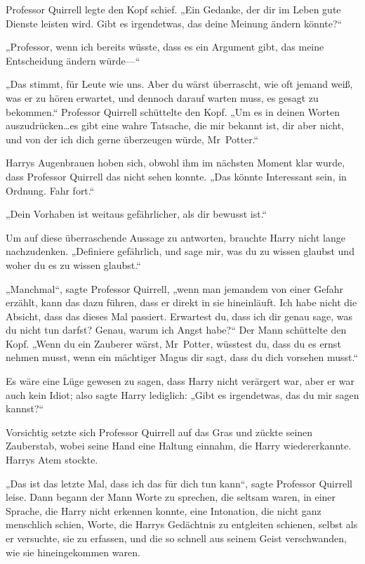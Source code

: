{Professor Quirrell legte den Kopf schief. „Ein Gedanke, der dir im Leben gute Dienste leisten wird. Gibt es irgendetwas, das deine Meinung ändern könnte?“

„Professor, wenn ich bereits wüsste, dass es ein Argument gibt, das meine Entscheidung ändern würde—“

„Das stimmt, für Leute wie uns. Aber du wärst überrascht, wie oft jemand weiß, was er zu hören erwartet, und dennoch darauf warten muss, es gesagt zu bekommen.“ Professor Quirrell schüttelte den Kopf. „Um es in deinen Worten auszudrücken…es gibt eine wahre Tatsache, die mir bekannt ist, dir aber nicht, und von der ich dich gerne überzeugen würde, Mr~Potter.“

Harrys Augenbrauen hoben sich, obwohl ihm im nächsten Moment klar wurde, dass Professor Quirrell das nicht sehen konnte. „Das könnte Interessant sein, in Ordnung. Fahr fort.“

„Dein Vorhaben ist weitaus gefährlicher, als dir bewusst ist.“

Um auf diese überraschende Aussage zu antworten, brauchte Harry nicht lange nachzudenken. „Definiere gefährlich, und sage mir, was du zu wissen glaubst und woher du es zu wissen glaubst.“

„Manchmal“, sagte Professor Quirrell, „wenn man jemandem von einer Gefahr erzählt, kann das dazu führen, dass er direkt in sie hineinläuft. Ich habe nicht die Absicht, dass das dieses Mal passiert. Erwartest du, dass ich dir genau sage, was du nicht tun darfst? Genau, warum ich Angst habe?“ Der Mann schüttelte den Kopf. „Wenn du ein Zauberer wärst, Mr~Potter, wüsstest du, dass du es ernst nehmen musst, wenn ein mächtiger Magus dir sagt, dass du dich vorsehen musst.“

Es wäre eine Lüge gewesen zu sagen, dass Harry nicht verärgert war, aber er war auch kein Idiot; also sagte Harry lediglich: „Gibt es irgendetwas, das du mir sagen kannst?“

Vorsichtig setzte sich Professor Quirrell auf das Gras und zückte seinen Zauberstab, wobei seine Hand eine Haltung einnahm, die Harry wiedererkannte. Harrys Atem stockte.

„Das ist das letzte Mal, dass ich das für dich tun kann“, sagte Professor Quirrell leise. Dann begann der Mann Worte zu sprechen, die seltsam waren, in einer Sprache, die Harry nicht erkennen konnte, eine Intonation, die nicht ganz menschlich schien, Worte, die Harrys Gedächtnis zu entgleiten schienen, selbst als er versuchte, sie zu erfassen, und die so schnell aus seinem Geist verschwanden, wie sie hineingekommen waren.

}
